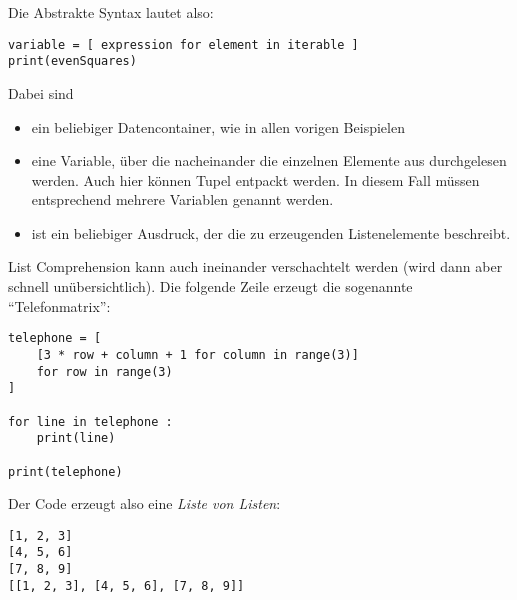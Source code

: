 Die Abstrakte Syntax lautet also:
\begin{codebox}
\begin{verbatim}
variable = [ expression for element in iterable ]
print(evenSquares)
\end{verbatim}
\end{codebox}
Dabei sind
\begin{itemize}
\item {} ein beliebiger Datencontainer, wie in allen vorigen Beispielen
\item {} eine Variable, über die nacheinander die einzelnen Elemente aus  durchgelesen werden. Auch hier können Tupel entpackt werden. In
	diesem Fall müssen entsprechend mehrere Variablen genannt werden.
\item {} ist ein beliebiger Ausdruck, der die zu erzeugenden Listenelemente beschreibt.
\end{itemize}

List Comprehension kann auch ineinander verschachtelt werden (wird dann aber schnell unübersichtlich). Die folgende Zeile erzeugt die sogenannte \enquote{Telefonmatrix}:

\begin{codebox}
\begin{verbatim}
telephone = [
    [3 * row + column + 1 for column in range(3)]
    for row in range(3)
]

for line in telephone :
    print(line)

print(telephone)
\end{verbatim}
\end{codebox}

Der Code erzeugt also eine \emph{Liste von Listen}:
\begin{cmdbox}
\begin{verbatim}
[1, 2, 3]
[4, 5, 6]
[7, 8, 9]
[[1, 2, 3], [4, 5, 6], [7, 8, 9]]
\end{verbatim}
\end{cmdbox}

